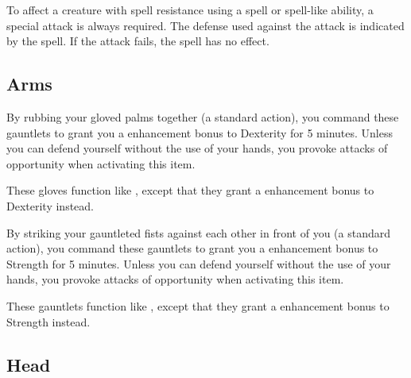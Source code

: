 To affect a creature with spell resistance using a spell or spell-like ability, a special attack is always required. The defense used against the attack is indicated by the spell. If the attack fails, the spell has no effect.


\subsection{Arms}

 By rubbing your gloved palms together (a standard action), you command these gauntlets to grant you a  enhancement bonus to Dexterity for 5 minutes. Unless you can defend yourself without the use of your hands, you provoke attacks of opportunity when activating this item.


 These gloves function like , except that they grant a  enhancement bonus to Dexterity instead.


 By striking your gauntleted fists against each other in front of you (a standard action), you command these gauntlets to grant you a  enhancement bonus to Strength for 5 minutes. Unless you can defend yourself without the use of your hands, you provoke attacks of opportunity when activating this item.


 These gauntlets function like , except that they grant a  enhancement bonus to Strength instead.


\subsection{Head}

